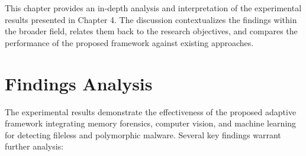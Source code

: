 This chapter provides an in-depth analysis and interpretation of the experimental results presented in Chapter 4. The discussion contextualizes the findings within the broader field, relates them back to the research objectives, and compares the performance of the proposed framework against existing approaches.

\section{Findings Analysis}
\label{sec:findings_analysis}

The experimental results demonstrate the effectiveness of the proposed adaptive framework integrating memory forensics, computer vision, and machine learning for detecting fileless and polymorphic malware. Several key findings warrant further analysis:

